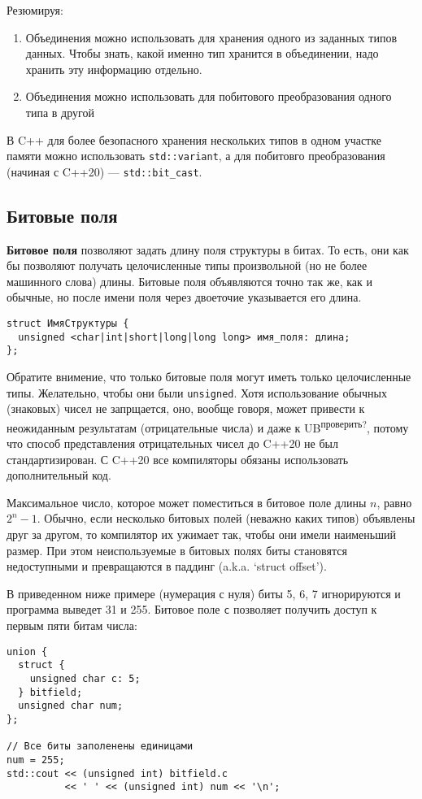 \documentclass[14pt, a4paper]{extarticle}
\begin{document}
Резюмируя:
\begin{enumerate}
  \item Объединения можно использовать для хранения одного из заданных типов данных. Чтобы знать,
  какой именно тип хранится в объединении, надо хранить эту информацию отдельно.
  \item Объединения можно использовать для побитового преобразования одного типа в другой
\end{enumerate}

{\small В C++ для более безопасного хранения нескольких типов в одном участке памяти можно использовать
\verb|std::variant|, а для побитовго преобразования (начиная с C++20) --- \verb|std::bit_cast|.}

\subsection*{Битовые поля}
\textbf{Битовое поля} позволяют задать длину поля структуры в битах. %
То есть, они как бы позволяют получать целочисленные типы произвольной (но не
более машинного слова) длины. Битовые поля объявляются точно так же, как и обычные,
но после имени поля через двоеточие указывается его длина.
\begin{verbatim}
struct ИмяСтруктуры {
  unsigned <char|int|short|long|long long> имя_поля: длина;
};
\end{verbatim}

Обратите внимение, что только битовые поля могут иметь только целочисленные типы.
{\small Желательно, чтобы они были \verb|unsigned|. Хотя использование обычных (знаковых)
чисел не запрщается, оно, вообще говоря, может привести к неожиданным результатам (отрицательные числа) и даже к UB\textsuperscript{проверить?},
потому что способ представления отрицательных чисел до C++20 не был стандартизирован.
С C++20 все компиляторы обязаны использовать дополнительный код.}

Максимальное число, которое может поместиться в битовое поле длины $n$, равно $2^n - 1$.
Обычно, если несколько битовых полей (неважно каких типов) объявлены друг за другом, то
компилятор их ужимает так, чтобы они имели наименьший размер. При этом неиспользуемые в
битовых полях биты становятся недоступными и превращаются в паддинг (a.k.a. `struct offset').

В приведенном ниже примере (нумерация с нуля) биты 5, 6, 7 игнорируются и программа
выведет 31 и 255. Битовое поле \verb|c| позволяет получить доступ к первым пяти битам числа:
\begin{verbatim}
union {
  struct {
    unsigned char c: 5;
  } bitfield;
  unsigned char num;
};

// Все биты заполенены единицами
num = 255;
std::cout << (unsigned int) bitfield.c
          << ' ' << (unsigned int) num << '\n';
\end{verbatim}
\end{document}
